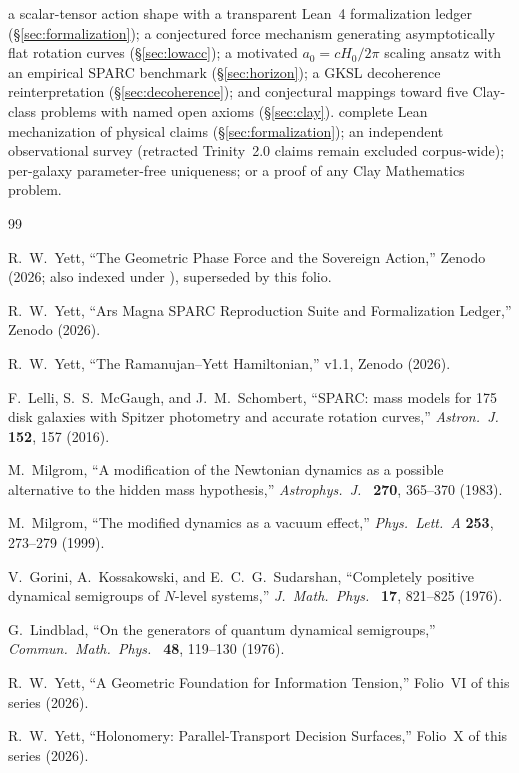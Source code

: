 \documentclass{alienfolio}
\begin{document}
 a scalar-tensor action shape with a transparent Lean~4
formalization ledger (\S\ref{sec:formalization}); a conjectured force
mechanism generating asymptotically flat rotation curves
(\S\ref{sec:lowacc}); a motivated $a_0 = cH_0/2\pi$ scaling ansatz with
an empirical SPARC benchmark (\S\ref{sec:horizon}); a GKSL decoherence
reinterpretation (\S\ref{sec:decoherence}); and conjectural mappings
toward five Clay-class problems with named open axioms (\S\ref{sec:clay}).
 complete Lean mechanization of physical claims
(\S\ref{sec:formalization}); an independent observational survey
(retracted Trinity~2.0 claims remain excluded corpus-wide); per-galaxy
parameter-free uniqueness; or a proof of any Clay Mathematics problem.

\goldrule

\begin{thebibliography}{99}

 R.~W.~Yett, ``The Geometric Phase Force and the
Sovereign Action,'' Zenodo  (2026;
also indexed under ), superseded by this
folio.

 R.~W.~Yett, ``Ars Magna SPARC Reproduction Suite and
Formalization Ledger,'' Zenodo  (2026).

 R.~W.~Yett, ``The Ramanujan--Yett Hamiltonian,'' v1.1,
Zenodo  (2026).

 F.~Lelli, S.~S.~McGaugh, and J.~M.~Schombert,
``SPARC: mass models for 175 disk galaxies with Spitzer photometry
and accurate rotation curves,'' \emph{Astron.\ J.\ } \textbf{152}, 157
(2016).

 M.~Milgrom, ``A modification of the Newtonian
dynamics as a possible alternative to the hidden mass hypothesis,''
\emph{Astrophys.\ J.\ } \textbf{270}, 365--370 (1983).

 M.~Milgrom, ``The modified dynamics as a vacuum
effect,'' \emph{Phys.\ Lett.\ A} \textbf{253}, 273--279 (1999).

 V.~Gorini, A.~Kossakowski, and E.~C.~G.~Sudarshan,
``Completely positive dynamical semigroups of $N$-level systems,''
\emph{J.\ Math.\ Phys.\ } \textbf{17}, 821--825 (1976).

 G.~Lindblad, ``On the generators of quantum
dynamical semigroups,'' \emph{Commun.\ Math.\ Phys.\ } \textbf{48},
119--130 (1976).

 R.~W.~Yett, ``A Geometric Foundation for Information
Tension,'' Folio~VI of this series (2026).

 R.~W.~Yett, ``Holonomery: Parallel-Transport Decision
Surfaces,'' Folio~X of this series (2026).

\end{thebibliography}
\end{document}
